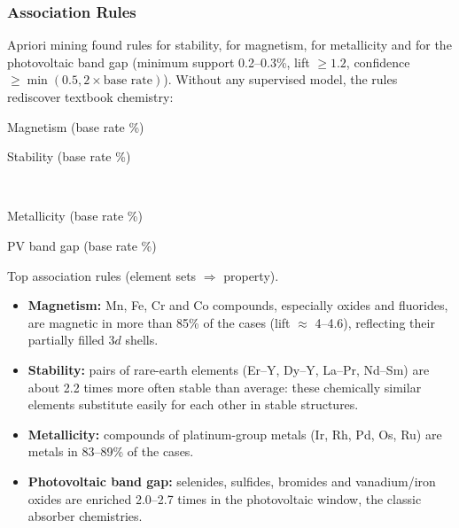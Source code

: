 \subsubsection{Association Rules}
Apriori mining found \RulesStab{} rules for stability, \RulesMag{} for magnetism, \RulesMetal{}
for metallicity and \RulesGap{} for the photovoltaic band gap (minimum support 0.2--0.3\%,
lift $\ge 1.2$, confidence $\ge \min(0.5, 2\times\text{base rate})$). Without any
supervised model, the rules rediscover textbook chemistry:

\begin{table}[H]
\centering\scriptsize
\begin{subtable}{0.49\textwidth}\centering
\caption{Magnetism (base rate \MagPos{}\%)}\end{subtable}\hfill
\begin{subtable}{0.49\textwidth}\centering
\caption{Stability (base rate \StabPos{}\%)}\end{subtable}\\[0.6em]
\begin{subtable}{0.49\textwidth}\centering
\caption{Metallicity (base rate \MetalPos{}\%)}\end{subtable}\hfill
\begin{subtable}{0.49\textwidth}\centering
\caption{PV band gap (base rate \GapPos{}\%)}\end{subtable}
\caption*{Top association rules (element sets $\Rightarrow$ property).}
\end{table}

\begin{itemize}
  \item \textbf{Magnetism:} Mn, Fe, Cr and Co compounds, especially oxides and fluorides, are
  magnetic in more than 85\% of the cases (lift $\approx$ 4--4.6), reflecting their partially
  filled $3d$ shells.
  \item \textbf{Stability:} pairs of rare-earth elements (Er--Y, Dy--Y, La--Pr, Nd--Sm) are
  about 2.2 times more often stable than average: these chemically similar elements substitute
  easily for each other in stable structures.
  \item \textbf{Metallicity:} compounds of platinum-group metals (Ir, Rh, Pd, Os, Ru) are metals
  in 83--89\% of the cases.
  \item \textbf{Photovoltaic band gap:} selenides, sulfides, bromides and vanadium/iron oxides
  are enriched 2.0--2.7 times in the photovoltaic window, the classic absorber chemistries.
\end{itemize}

